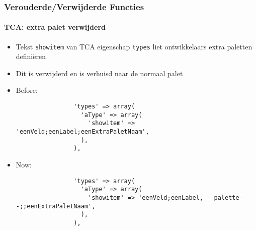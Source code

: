 \begin{frame}[fragile]
	\frametitle{Verouderde/Verwijderde Functies}
	\framesubtitle{TCA: extra palet verwijderd}

	\lstset{basicstyle=\tiny\ttfamily}

	\begin{itemize}

		\item Tekst \texttt{showitem} van TCA eigenschap \texttt{types} liet ontwikkelaars extra
			paletten definiëren

		\item Dit is verwijderd en is verhuisd naar de normaal palet

		\item Before:

			\begin{lstlisting}
				'types' => array(
				  'aType' => array(
				    'showitem' => 'eenVeld;eenLabel;eenExtraPaletNaam',
				  ),
				),
			\end{lstlisting}

		\item Now:

			\begin{lstlisting}
				'types' => array(
				  'aType' => array(
				    'showitem' => 'eenVeld;eenLabel, --palette--;;eenExtraPaletNaam',
				  ),
				),
			\end{lstlisting}

	\end{itemize}

\end{frame}


